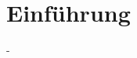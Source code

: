 \documentclass[12pt,a4paper,titlepage,oneside]{article}
\subtitle{Robotik und Automation in der KFZ-Elektronik}
\begin{document}
\maketitle

\section{Einführung}
-


\end{document}
